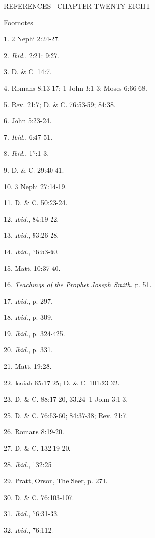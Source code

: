 \newpage
REFERENCES—CHAPTER TWENTY-EIGHT

Footnotes

1. 2 Nephi 2:24-27.

2. \textit{Ibid.}, 2:21; 9:27.

3. D. \& C. 14:7.

4. Romans 8:13-17; 1 John 3:1-3; Moses 6:66-68.

5. Rev. 21:7; D. \& C. 76:53-59; 84:38.

6. John 5:23-24.

7. \textit{Ibid.}, 6:47-51.

8. \textit{Ibid.}, 17:1-3.

9. D. \& C. 29:40-41.

10. 3 Nephi 27:14-19.

11. D. \& C. 50:23-24.

12. \textit{Ibid.}, 84:19-22.

13. \textit{Ibid.}, 93:26-28.

14. \textit{Ibid.}, 76:53-60.

15. Matt. 10:37-40.

16. \textit{Teachings of the Prophet Joseph Smith}, p. 51.

17. \textit{Ibid.}, p. 297.

18. \textit{Ibid.}, p. 309.

19. \textit{Ibid.}, p. 324-425.

20. \textit{Ibid.}, p. 331.

21. Matt. 19:28.

22. Isaiah 65:17-25; D. \& C. 101:23-32.

23. D. \& C. 88:17-20, 33.24. 1 John 3:1-3.

25. D. \& C. 76:53-60; 84:37-38; Rev. 21:7.

26. Romans 8:19-20.

27. D. \& C. 132:19-20.

28. \textit{Ibid.}, 132:25.

29. Pratt, Orson, The Seer, p. 274.

30. D. \& C. 76:103-107.

31. \textit{Ibid.}, 76:31-33.

32. \textit{Ibid.}, 76:112.


